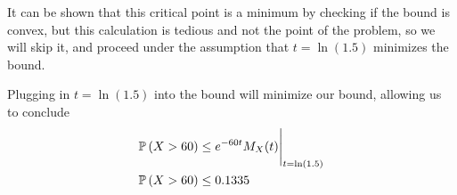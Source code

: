 \documentclass{exam}
\begin{document}
\begin{questions}
It can be shown that this critical point is a minimum by checking if the bound is convex, but this calculation is tedious and not the point of the problem, so we will skip it, and proceed under the assumption that $t = \ln (1.5)$ minimizes the bound.

Plugging in $t = \ln (1.5)$ into the bound will minimize our bound, allowing us to conclude
\begin{align*}
    \mathbb{P}\left( X > 60 \right) &\leq e^{-60t}M_X(t)\Bigg |_{t = \ln (1.5)} \\
    \mathbb{P}\left( X > 60 \right) &\leq 0.1335 \\
\end{align*}
\end{questions}
\end{document}
